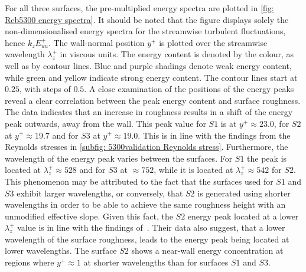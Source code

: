 For all three surfaces, the pre-multiplied energy spectra are plotted in \autoref{fig: Reb5300 energy spectra}.
It should be noted that the figure displays solely the non-dimensionalised energy spectra for the streamwise turbulent fluctuations, hence $k_zE_{uu}^+$.
The wall-normal position $y^+$ is plotted over the streamwise wavelength $\lambda_z^+$ in viscous units.
The energy content is denoted by the colour, as well as by contour lines.
Blue and purple shadings denote weak energy content, while green and yellow indicate
 strong energy content.
The contour lines start at $0.25$, with steps of $0.5$.
A close examination of the positions of the energy peaks reveal a clear correlation between the peak energy content and surface roughness. 
The data indicates that an increase in roughness results in a shift of the energy peak outwards, away from the wall.
This peak value for $S1$ is at $y^+ \approx 23.0$, for $S2$ at $y^+ \approx 19.7$ and for $S3$ at $y^+ \approx 19.0$.
This is in line with the findings from the Reynolds stresses in \autoref{subfig: 5300validation Reynolds stress}.
Furthermore, the wavelength of the energy peak varies between the surfaces. 
For $S1$ the peak is located at $\lambda_z^+ \approx 528$ and for $S3$ at $\approx 752$, while it is located at $\lambda_z^+ \approx 542$ for $S2$.
This phenomenon may be attributed to the fact that the surfaces used for $S1$ and $S3$ exhibit larger wavelengths, or conversely, that $S2$ is generated using shorter wavelengths in order to be able to achieve the same roughness height with an unmodified effective slope.
Given this fact, the $S2$ energy peak located at a lower $\lambda_z^+$ value is in line with the findings of~\cite{chanSecondaryMotionTurbulent2018}.
Their data also suggest, that a lower wavelength of the surface roughness, leads to the energy peak being located at lower wavelengths.
The surface $S2$ shows a near-wall energy concentration at regions where $y^+ \approx 1$ at shorter wavelengths than for surfaces $S1$ and $S3$.

